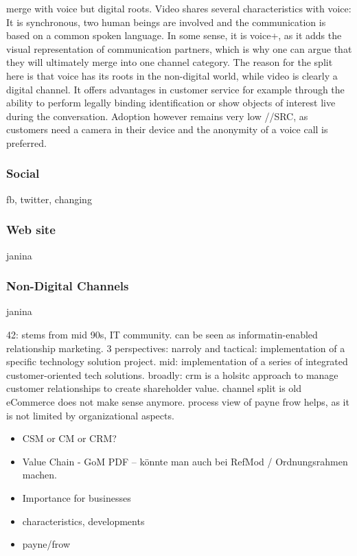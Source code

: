 		merge with voice but digital roots. 
		Video shares several characteristics with voice: It is synchronous, two human beings are involved and the communication is based on a common spoken language. In some sense, it is voice+, as it adds the visual representation of communication partners, which is why one can argue that they will ultimately merge into one channel category. The reason for the split here is that voice has its roots in the non-digital world, while video is clearly a digital channel. It offers advantages in customer service for example through the ability to perform legally binding identification or show objects of interest live during the conversation. Adoption however remains very low //SRC, as customers need a camera in their device and the anonymity of a voice call is preferred.
		
		\subsubsection{Social}
		fb, twitter, changing
		\subsubsection{Web site}
		
		
		
	
			
		
		janina
		\subsubsection{Non-Digital Channels}
		
		janina
		
		42: stems from mid 90s, IT community. can be seen as informatin-enabled relationship marketing. 3 perspectives: narroly and tactical: implementation of a specific technology solution project. mid: implementation of a series of integrated customer-oriented tech solutions. broadly: crm is a holsitc approach to manage customer relationships to create shareholder value. channel split is old eCommerce does not make sense anymore.
		process view of payne frow helps, as it is not limited by organizational aspects. 
				\begin{itemize}
			\item CSM or CM or CRM?
			\item Value Chain - GoM PDF -- könnte man auch bei RefMod / Ordnungsrahmen machen. 			
			\item Importance for businesses
			\item characteristics, developments 
			\item payne/frow
		\end{itemize}
	
